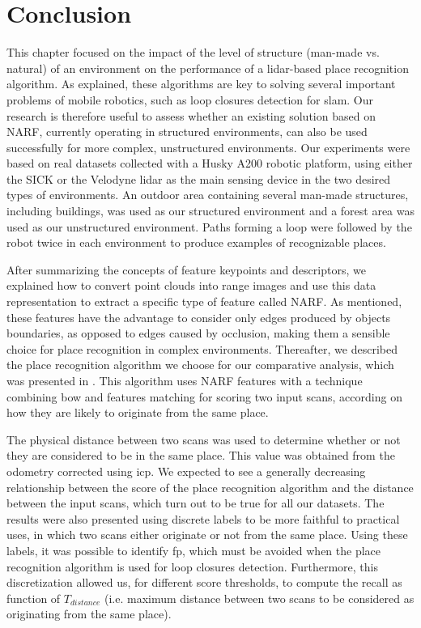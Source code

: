 \section{Conclusion}
\label{sec:chap_slam_conclu}

This chapter focused on the impact of the level of structure (man-made vs. natural) of an environment on the performance of a \gls*{lidar}-based place recognition algorithm. As explained, these algorithms are key to solving several important problems of mobile robotics, such as loop closures detection for \gls*{slam}. Our research is therefore useful to assess whether an existing solution based on NARF, currently operating in structured environments, can also be used successfully for more complex, unstructured environments. Our experiments were based on real datasets collected with a Husky A200 robotic platform, using either the SICK or the Velodyne \gls*{lidar} as the main sensing device in the two desired types of environments. An outdoor area containing several man-made structures, including buildings, was used as our structured environment and a forest area was used as our unstructured environment. Paths forming a loop were followed by the robot twice in each environment to produce examples of recognizable places.

After summarizing the concepts of feature keypoints and descriptors, we explained how to convert point clouds into range images and use this data representation to extract a specific type of feature called NARF. As mentioned, these features have the advantage to consider only edges produced by objects boundaries, as opposed to edges caused by occlusion, making them a sensible choice for place recognition in complex environments. Thereafter, we described the place recognition algorithm we choose for our comparative analysis, which was presented in \citep{Steder2011b}. This algorithm uses NARF features with a technique combining \gls*{bow} and features matching for scoring two input scans, according on how they are likely to originate from the same place. 

The physical distance between two scans was used to determine whether or not they are considered to be in the same place. This value was obtained from the odometry corrected using \gls*{icp}. We expected to see a generally decreasing relationship between the score of the place recognition algorithm and the distance between the input scans, which turn out to be true for all our datasets. The results were also presented using discrete labels to be more faithful to practical uses, in which two scans either originate or not from the same place. Using these labels, it was possible to identify \gls*{fp}, which must be avoided when the place recognition algorithm is used for loop closures detection. Furthermore, this discretization allowed us, for different score thresholds, to compute the recall as function of $T_{distance}$ (i.e. maximum distance between two scans to be considered as originating from the same place).


